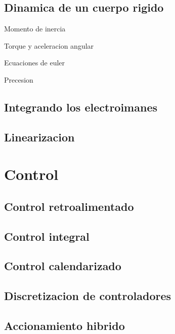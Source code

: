 \subsection{Dinamica de un cuerpo rigido}

Momento de inercia

Torque y aceleracion angular

Ecuaciones de euler

Precesion
\subsection{Integrando los electroimanes}
\subsection{Linearizacion}
\section{Control}
\subsection{Control retroalimentado}
\subsection{Control integral}
\subsection{Control calendarizado}
\subsection{Discretizacion de controladores}
\subsection{Accionamiento hibrido}

